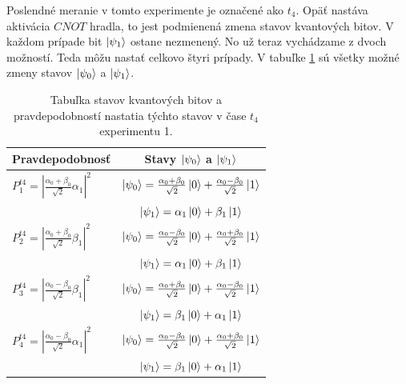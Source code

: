 Poslendné meranie v tomto experimente je označené ako \(t_4\). Opäť nastáva
aktivácia \(CNOT\) hradla, to jest podmienená zmena stavov kvantových bitov.
V každom prípade bit \(\ket{\psi_1}\) ostane nezmenený. No už teraz vychádzame 
z dvoch možností. Teda môžu nastať celkovo štyri prípady. V tabuľke 
\ref{expr1_t4_states} sú všetky možné zmeny stavov \(\ket{\psi_0}\) a
\(\ket{\psi_1}\).

\begin{table}
\centering
\begin{tabular}{|l|c|}
\hline
\textbf{Pravdepodobnosť} & \textbf{Stavy \(\ket{\psi_0}\) a \(\ket{\psi_1}\)} \\
\hline
\(P^{t4}_1 = |\frac{\alpha_0 + \beta_0}{\sqrt{2}}\alpha_1|^2\) & 
\(\ket{\psi_0} = \frac{\alpha_0 + \beta_0}{\sqrt{2}}\ket{0} + \frac{\alpha_0 - \beta_0}{\sqrt{2}}\ket{1}\) \\
& \(\ket{\psi_1} = \alpha_1\ket{0} + \beta_1\ket{1}\) \\
\hline

\(P^{t4}_2 = |\frac{\alpha_0 + \beta_0}{\sqrt{2}}\beta_1|^2\) & 
\(\ket{\psi_0} = \frac{\alpha_0 - \beta_0}{\sqrt{2}}\ket{0} + \frac{\alpha_0 + \beta_0}{\sqrt{2}}\ket{1}\) \\
& \(\ket{\psi_1} = \alpha_1\ket{0} + \beta_1\ket{1}\) \\
\hline

\(P^{t4}_3 = |\frac{\alpha_0 - \beta_0}{\sqrt{2}}\beta_1|^2\) & 
\(\ket{\psi_0} = \frac{\alpha_0 + \beta_0}{\sqrt{2}}\ket{0} + \frac{\alpha_0 - \beta_0}{\sqrt{2}}\ket{1}\) \\
& \(\ket{\psi_1} = \beta_1\ket{0} + \alpha_1\ket{1}\) \\
\hline

\(P^{t4}_4 = |\frac{\alpha_0 - \beta_0}{\sqrt{2}}\alpha_1|^2\) & 
\(\ket{\psi_0} = \frac{\alpha_0 - \beta_0}{\sqrt{2}}\ket{0} + \frac{\alpha_0 + \beta_0}{\sqrt{2}}\ket{1}\) \\
& \(\ket{\psi_1} = \beta_1\ket{0} + \alpha_1\ket{1}\) \\
\hline

\end{tabular}

\caption{\label{expr1_t4_states} Tabuľka stavov kvantových bitov a pravdepodobností
nastatia týchto stavov v čase \(t_4\) experimentu 1.}
\end{table}

